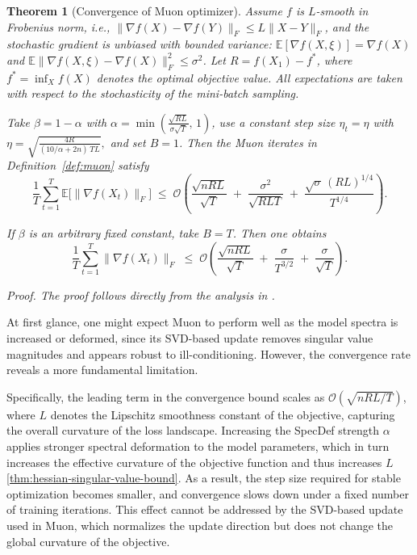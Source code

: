 \documentclass{article}
\theoremstyle{plain}
\newtheorem{theorem}{Theorem}
\theoremstyle{definition}
\theoremstyle{remark}
\begin{document}
\begin{theorem}[Convergence of Muon optimizer]
\label{thm:muon-conv}
Assume $f$ is $L$-smooth in Frobenius norm, i.e.,
$\|\nabla f(X)-\nabla f(Y)\|_F \le L\|X-Y\|_F$,
and the stochastic gradient is unbiased with bounded variance:
$\mathbb{E}[\nabla f(X,\xi)] = \nabla f(X)$ and
$\mathbb{E}\|\nabla f(X,\xi)-\nabla f(X)\|_F^2 \le \sigma^2$.
Let $R = f(X_1)-f^*$, where $f^* = \inf_X f(X)$ denotes the optimal objective value. All expectations are taken with respect to the stochasticity of the mini-batch sampling.

Take $\beta = 1-\alpha$ with $\alpha = \min\!\left(\frac{\sqrt{RL}}{\sigma\sqrt{T}},\,1\right)$,
use a constant step size $\eta_t=\eta$ with $\eta = \sqrt{\frac{4R}{(10/\alpha + 2n)\,TL}},$ and set $B=1$. Then the Muon iterates in Definition~\ref{def:muon} satisfy
\begin{equation}
\frac{1}{T}\sum_{t=1}^T \mathbb{E}\big[\|\nabla f(X_t)\|_F\big]
\;\le\;
\mathcal{O}\!\left(
\frac{\sqrt{nRL}}{\sqrt{T}}
\;+\;
\frac{\sigma^2}{\sqrt{RLT}}
\;+\;
\frac{\sqrt{\sigma}\,(RL)^{1/4}}{T^{1/4}}
\right).
\end{equation}

If $\beta$ is an arbitrary fixed constant, take $B=T$. Then one obtains
\begin{equation}
\frac{1}{T}\sum_{t=1}^T \|\nabla f(X_t)\|_F
\;\le\;
\mathcal{O}\!\left(
\frac{\sqrt{nRL}}{\sqrt{T}}
\;+\;
\frac{\sigma}{T^{3/2}}
\;+\;
\frac{\sigma}{\sqrt{T}}
\right).
\end{equation}

\smallskip
\noindent
\emph{Proof.} The proof follows directly from the analysis in \citet{li2025muon}.
\end{theorem}

At first glance, one might expect Muon to perform well as the model spectra is increased or deformed, since its SVD-based update removes singular value magnitudes and appears robust to ill-conditioning. However, the convergence rate reveals a more fundamental limitation.

Specifically, the leading term in the convergence bound scales as $\mathcal{O}(\sqrt{nRL/T})$, where $L$ denotes the Lipschitz smoothness constant of the objective, capturing the overall curvature of the loss landscape. Increasing the SpecDef strength $\alpha$ applies stronger spectral deformation to the model parameters, which in turn increases the effective curvature of the objective function and thus increases $L$ \cref{thm:hessian-singular-value-bound}. As a result, the step size required for stable optimization becomes smaller, and convergence slows down under a fixed number of training iterations. This effect cannot be addressed by the SVD-based update used in Muon, which normalizes the update direction but does not change the global curvature of the objective.
\end{document}
